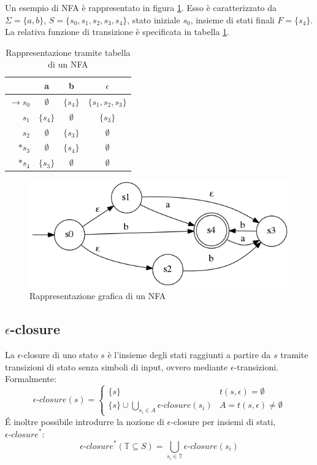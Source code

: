 \begin{ex}
Un esempio di NFA è rappresentato in figura \ref{fig:nfa}. Esso è caratterizzato da $\Sigma = \{ a,b\}$, $S = \{ s_0,s_1,s_2,s_3,s_4\}$, stato iniziale $s_0$, insieme di stati finali $F = \{s_4\}$. La relativa funzione di transizione è specificata in tabella \ref{tab:nfa}.

\begin{table}[htbp]
\begin{center}
\begin{tabular}{r | c  c  c}
& a & b & $\epsilon$ \\ \hline
$\rightarrow s_0$ & $\emptyset$ & $\{s_4\}$ & $\{s_1,s_2,s_3\}$\\
$s_1$ & $\{s_4\}$ & $\emptyset$ & $\{s_3\}$\\
$s_2$ & $\emptyset$ & $\{s_3\}$ & $\emptyset$\\ 
$*s_3$ & $\emptyset$ & $\{s_4\}$ & $\emptyset$\\ 
$*s_4$ & $\{s_3\}$ & $\emptyset$ & $\emptyset$\\
\end{tabular}
\caption{Rappresentazione tramite tabella di un NFA}
\label{tab:nfa}
\end{center}
\end{table}

\begin{figure}[htbp]
\centering
\includegraphics[scale=0.4]{./Img/automi/nfa.png}
\caption{Rappresentazione grafica di un NFA}
\label{fig:nfa}
\end{figure}

\end{ex}

\subsection{$\mathcal{\epsilon}$-closure}
La $\epsilon$-closure di uno stato $s$ è l'insieme degli stati raggiunti a partire da $s$ tramite transizioni di stato senza simboli di input, ovvero mediante $\epsilon$-transizioni.
Formalmente:
$$
\epsilon\textit{-closure}(s) = \begin{cases}
\{s\} & t(s, \epsilon) = \emptyset \\
\{s\} \cup \displaystyle \bigcup_{s_i \in A} \epsilon\textit{-closure}(s_i) & A = t(s, \epsilon) \ne \emptyset
\end{cases}
$$
\'E inoltre possibile introdurre la nozione di $\epsilon$-closure per insiemi di stati, $\epsilon\textit{-closure}^*$:
$$
\epsilon\textit{-closure}^*(\mathbb{T} \subseteq S) = \displaystyle\bigcup_{s_i \in \mathbb{T}} \epsilon\textit{-closure}(s_i)
$$


